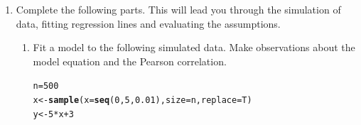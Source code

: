 \documentclass{article}\usepackage[]{graphicx}\usepackage[]{color}
\makeatletter
\newcommand{\hlnum}[1]{\textcolor[rgb]{0.686,0.059,0.569}{#1}}%
\newcommand{\hlopt}[1]{\textcolor[rgb]{0,0,0}{#1}}%
\newcommand{\hlstd}[1]{\textcolor[rgb]{0.345,0.345,0.345}{#1}}%
\newcommand{\hlkwb}[1]{\textcolor[rgb]{0.69,0.353,0.396}{#1}}%
\newcommand{\hlkwc}[1]{\textcolor[rgb]{0.333,0.667,0.333}{#1}}%
\newcommand{\hlkwd}[1]{\textcolor[rgb]{0.737,0.353,0.396}{\textbf{#1}}}%
\newenvironment{kframe}{%
 \def\at@end@of@kframe{}%
 \ifinner\ifhmode%
  \def\at@end@of@kframe{\end{minipage}}%
  \begin{minipage}{\columnwidth}%
 \fi\fi%
 \def\FrameCommand##1{\hskip\@totalleftmargin \hskip-\fboxsep
 \colorbox{shadecolor}{##1}\hskip-\fboxsep
     \hskip-\linewidth \hskip-\@totalleftmargin \hskip\columnwidth}%
 \MakeFramed {\advance\hsize-\width
   \@totalleftmargin\z@ \linewidth\hsize
   \@setminipage}}%
 {\par\unskip\endMakeFramed%
 \at@end@of@kframe}
\newenvironment{knitrout}{}{} %
\makeatother
\begin{document}
\begin{enumerate}
\begin{enumerate}
\end{enumerate}
\newpage
  \item Complete the following parts. This will lead you through the simulation
  of data, fitting regression lines and evaluating the assumptions.
  \begin{enumerate}
  \item Fit a model to the following simulated data. Make observations about
  the model equation and the Pearson correlation.
\begin{knitrout}
\color{fgcolor}\begin{kframe}
\begin{alltt}
\hlstd{n}\hlkwb{=}\hlnum{500}
\hlstd{x}\hlkwb{<-}\hlkwd{sample}\hlstd{(}\hlkwc{x} \hlstd{=} \hlkwd{seq}\hlstd{(}\hlnum{0}\hlstd{,}\hlnum{5}\hlstd{,}\hlnum{0.01}\hlstd{),} \hlkwc{size}\hlstd{=n,} \hlkwc{replace}\hlstd{=T)}
\hlstd{y}\hlkwb{<-}\hlnum{5}\hlopt{*}\hlstd{x} \hlopt{+} \hlnum{3}
\end{alltt}
\end{kframe}
\end{knitrout}


\end{enumerate}
\end{enumerate}
\end{document}
